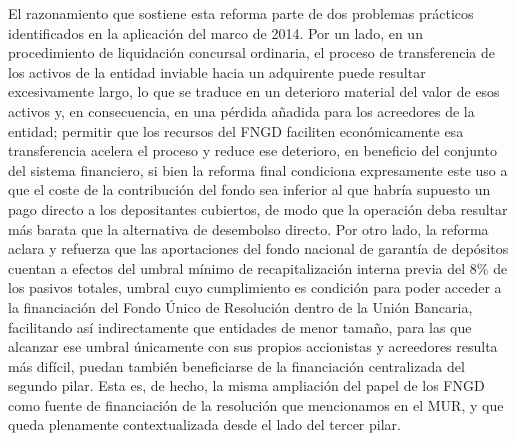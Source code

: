 \documentclass[10pt,a4paper]{article}
\begin{document}
{El razonamiento que sostiene esta reforma parte de dos problemas prácticos identificados en la aplicación del marco de 2014. Por un lado, en un procedimiento de liquidación concursal ordinaria, el proceso de transferencia de los activos de la entidad inviable hacia un adquirente puede resultar excesivamente largo, lo que se traduce en un deterioro material del valor de esos activos y, en consecuencia, en una pérdida añadida para los acreedores de la entidad; permitir que los recursos del FNGD faciliten económicamente esa transferencia acelera el proceso y reduce ese deterioro, en beneficio del conjunto del sistema financiero, si bien la reforma final condiciona expresamente este uso a que el coste de la contribución del fondo sea inferior al que habría supuesto un pago directo a los depositantes cubiertos, de modo que la operación deba resultar más barata que la alternativa de desembolso directo. Por otro lado, la reforma aclara y refuerza que las aportaciones del fondo nacional de garantía de depósitos cuentan a efectos del umbral mínimo de recapitalización interna previa del $8\%$ de los pasivos totales, umbral cuyo cumplimiento es condición para poder acceder a la financiación del Fondo Único de Resolución dentro de la Unión Bancaria, facilitando así indirectamente que entidades de menor tamaño, para las que alcanzar ese umbral únicamente con sus propios accionistas y acreedores resulta más difícil, puedan también beneficiarse de la financiación centralizada del segundo pilar. Esta es, de hecho, la misma ampliación del papel de los FNGD como fuente de financiación de la resolución que mencionamos en el MUR, y que queda plenamente contextualizada desde el lado del tercer pilar.

}
\end{document}
